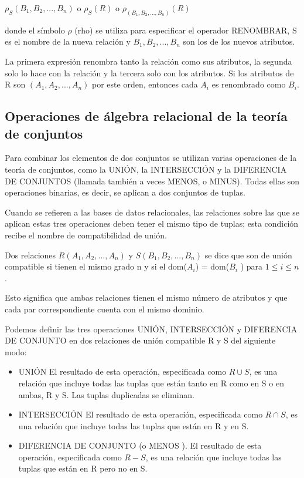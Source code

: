 $\rho_S (B_1,B_2,...,B_n)$ o $\rho_S (R)$ o $\rho_{(B_1,B_2,...,B_n)}(R)$


donde el símbolo $\rho$ (rho) se utiliza para especificar el operador RENOMBRAR, S es el nombre de la nueva relación y $B_{1} , B_{2} ,..., B_{n}$ son los de los nuevos atributos.


La primera expresión renombra tanto la relación como sus atributos, la segunda solo lo hace con la relación y la tercera solo con los atributos. Si los atributos de R son $(A_1, A_2,...,A_n)$ por este orden, entonces cada $A_i$ es renombrado como $B_i$. 
\subsection*{Operaciones de álgebra relacional de la teoría de conjuntos}

Para combinar los elementos de dos conjuntos se utilizan varias operaciones de la teoría de conjuntos, como la UNIÓN, la INTERSECCIÓN y la DIFERENCIA DE CONJUNTOS (llamada también a veces MENOS, o MINUS). Todas ellas son operaciones binarias, es decir, se aplican a dos conjuntos de tuplas.


Cuando se refieren a las bases de datos relacionales, las relaciones sobre las que se aplican estas tres operaciones deben tener el mismo tipo de tuplas; esta condición recibe el nombre de compatibilidad de unión. 


Dos relaciones $R(A_1, A_2,...,A_n)$ y $S(B_1,B_2,...,B_n)$ se dice que son de unión compatible si tienen el mismo grado n y si el dom($A_i$) = dom($B_i$ ) para $1 \leq i \leq n$. 


Esto significa que ambas relaciones tienen el mismo número de atributos y que cada par correspondiente cuenta con el mismo dominio.


Podemos definir las tres operaciones UNIÓN, INTERSECCIÓN y DIFERENCIA DE CONJUNTO en dos relaciones de unión compatible R y S del siguiente modo:

\begin{itemize}
    \item UNIÓN El resultado de esta operación, especificada como $R \cup S$, es una relación que incluye todas las tuplas que están tanto en R como en S o en ambas, R y S. Las tuplas duplicadas se eliminan.

    \item INTERSECCIÓN El resultado de esta operación, especificada como $R \cap S$, es una relación que incluye todas las tuplas que están en R y en S.
    
    \item  DIFERENCIA DE CONJUNTO (o MENOS ). El resultado de esta operación, especificada como $R - S$, es una relación que incluye todas las tuplas que están en R pero no en S.
\end{itemize}

